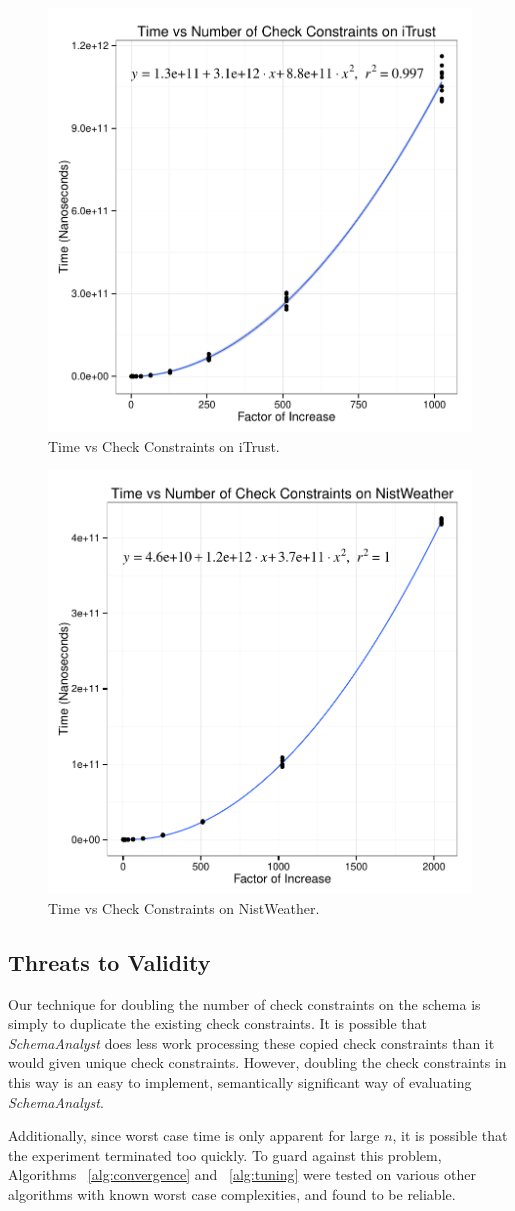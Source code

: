 \documentclass[smallextended]{svjour3}       %
\begin{document}
\begin{figure}
\centering
  \centering
  \includegraphics[width=.5\linewidth]{iTrustChecks.pdf}
  \caption{Time vs Check Constraints on iTrust.}
  \label{fig:iTrust}
\end{figure}
\begin{figure}
  \centering
  \includegraphics[width=.5\linewidth]{NistWeatherChecks.pdf}
  \caption{Time vs Check Constraints on NistWeather.}
  \label{fig:NistWeather}
\end{figure}

\subsection*{Threats to Validity}
Our technique for doubling the number of check constraints on the schema
is simply to duplicate the existing check constraints. It is possible
that \textit{SchemaAnalyst} does less work processing these copied check
constraints than it would given unique check constraints. However,
doubling the check constraints in this way is an easy to implement,
semantically significant way of evaluating \textit{SchemaAnalyst}.

Additionally, since worst case time is only apparent for large $n$, 
it is possible that the experiment terminated too quickly.  To guard 
against this problem, Algorithms ~\ref{alg:convergence} and ~\ref{alg:tuning}
were tested on various other algorithms with known worst case complexities, and 
found to be reliable.
\end{document}
